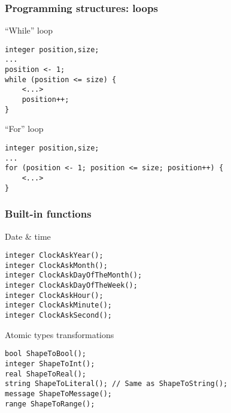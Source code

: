 \documentclass[11pt]{beamer}
\begin{document}
\begin{frame}[fragile]
\frametitle{Programming structures: loops}
\begin{block}{``While'' loop}
\scriptsize
\begin{lstlisting}[language=lekta]
integer position,size;
...
position <- 1;
while (position <= size) {
	<...>
	position++;
}
\end{lstlisting}
\end{block}
\pause
{}
\begin{block}{``For'' loop}
\scriptsize
\begin{lstlisting}[language=lekta]
integer position,size;
...
for (position <- 1; position <= size; position++) {
	<...>
}
\end{lstlisting}
\end{block}
\end{frame}

\begin{frame}[fragile]
\frametitle{Built-in functions}
\begin{block}{Date \& time}
\scriptsize
\begin{lstlisting}[language=lekta]
integer ClockAskYear();
integer ClockAskMonth();
integer ClockAskDayOfTheMonth();
integer ClockAskDayOfTheWeek();
integer ClockAskHour();
integer ClockAskMinute();
integer ClockAskSecond();
\end{lstlisting}
\end{block}
\pause
{}
\begin{block}{Atomic types transformations}
\scriptsize
\begin{lstlisting}[language=lekta]
bool ShapeToBool();
integer ShapeToInt();
real ShapeToReal();
string ShapeToLiteral(); // Same as ShapeToString();
message ShapeToMessage();
range ShapeToRange();
\end{lstlisting}
\end{block}
\end{frame}
\end{document}
